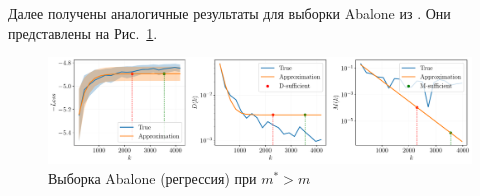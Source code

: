 Далее получены аналогичные результаты для выборки Abalone из \citep{UCI}. Они представлены на Рис.~\ref{abalone-approximation}.

\begin{figure}[h!]
    \centering
    \includegraphics[width=\textwidth]{figures/abalone-approximation.pdf}
    \caption{Выборка Abalone (регрессия) при $m^* > m$}
    \label{abalone-approximation}
\end{figure}
